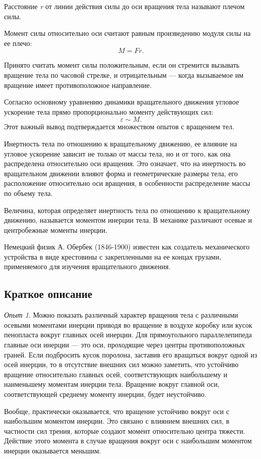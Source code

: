 \documentclass[All.tex]{subfiles}
\begin{document}
	Расстояние \textit{r} от линии действия силы до оси вращения тела называют плечом силы. 
	
	Момент силы относительно оси считают равным произведению модуля силы на ее плечо: $$ M=Fr. $$
	
	Принято считать момент силы положительным, если он стремится вызывать вращение тела по часовой стрелке, и отрицательным — когда вызываемое им вращение имеет противоположное направление. 
	
	Согласно основному уравнению динамики вращательного движения угловое ускорение тела прямо пропорционально моменту действующих сил: $$ \varepsilon \sim M. $$
	Этот важный вывод подтверждается множеством опытов с вращением тел.
	
	Инертность тела по отношению к вращательному движению, ее влияние на угловое ускорение зависит не только от массы тела, но и от того, как она распределена относительно оси вращения. 
	Это означает, что на инертность во вращательном движении влияют форма и геометрические размеры тела, его расположение относительно оси вращения, в особенности распределение массы по объему тела. 
	
	Величина, которая определяет инертность тела по отношению к вращательному движению, называется моментом инерции тела.
	В механике различают осевые и центробежные моменты инерции. 
	
	Немецкий физик А. Обербек (1846-1900) известен как создатель механического устройства в виде крестовины с закрепленными на ее концах грузами, применяемого для изучения вращательного движения.

		\subsection*{\textcolor{PineGreen}{Краткое описание}}
		
	\textit{Опыт 1}. 
	Можно показать различный характер вращения тела с различными осевыми моментами инерции приводя во вращение в воздухе коробку или кусок пенопласта вокруг главных осей инерции.
	Для прямоугольного параллелепипеда главные оси инерции — это оси, проходящие через центры противоположных граней.
	Если подбросить кусок поролона, заставив его вращаться вокруг одной из осей инерции, то в отсутствие внешних сил можно заметить, что устойчиво вращение относительно главных осей, соответствующих наибольшему и наименьшему моментам инерции тела.
	Вращение вокруг главной оси, соответствующей среднему моменту инерции, будет неустойчиво.

	Вообще, практически оказывается, что вращение устойчиво вокруг оси с наибольшим моментом инерции.
	Это связано с влиянием внешних сил, в частности сил трения, которые создают момент относительно центра тяжести.
	Действие этого момента в случае вращения вокруг оси с наибольшим моментом инерции оказывается меньшим.
	
\end{document}

